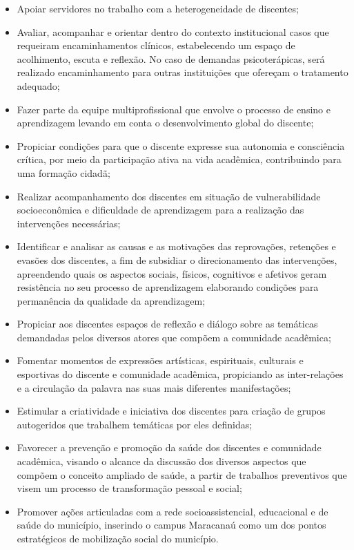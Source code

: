 \begin{itemize}
	\item Apoiar servidores no trabalho com a heterogeneidade de discentes;
	\item Avaliar, acompanhar e orientar dentro do contexto institucional casos que requeiram encaminhamentos clínicos, estabelecendo um espaço de acolhimento, escuta e reflexão. No caso de demandas psicoterápicas, será realizado encaminhamento para outras instituições que ofereçam o tratamento adequado;
	\item Fazer parte da equipe multiprofissional que envolve o processo de ensino e aprendizagem levando em conta o desenvolvimento global do discente;
	\item Propiciar condições para que o discente expresse sua autonomia e consciência crítica, por meio da participação ativa na vida acadêmica, contribuindo para uma formação cidadã; 
	\item Realizar acompanhamento dos discentes em situação de vulnerabilidade socioeconômica e dificuldade de aprendizagem para a realização das intervenções necessárias;
	\item Identificar e analisar as causas e as motivações das reprovações, retenções e evasões dos discentes, a fim de subsidiar o direcionamento das intervenções, apreendendo quais os aspectos sociais, físicos, cognitivos e afetivos geram resistência no seu processo de aprendizagem elaborando condições para permanência da qualidade da aprendizagem;
	\item Propiciar aos discentes espaços de reflexão e diálogo sobre as temáticas demandadas pelos diversos atores que compõem a comunidade acadêmica; 
	\item Fomentar momentos de expressões artísticas, espirituais, culturais e esportivas do discente e comunidade acadêmica, propiciando as inter-relações e a circulação da palavra nas suas mais diferentes manifestações;
	\item Estimular a criatividade e iniciativa dos discentes para criação de grupos autogeridos que trabalhem temáticas por eles definidas;
	\item Favorecer a prevenção e promoção da saúde dos discentes e comunidade acadêmica, visando o alcance da discussão dos diversos aspectos que compõem o conceito ampliado de saúde, a partir de trabalhos preventivos que visem um processo de transformação pessoal e social;
	\item Promover ações articuladas com a rede socioassistencial, educacional e de saúde do município, inserindo o campus Maracanaú como um dos pontos estratégicos de mobilização social do município.
\end{itemize}


